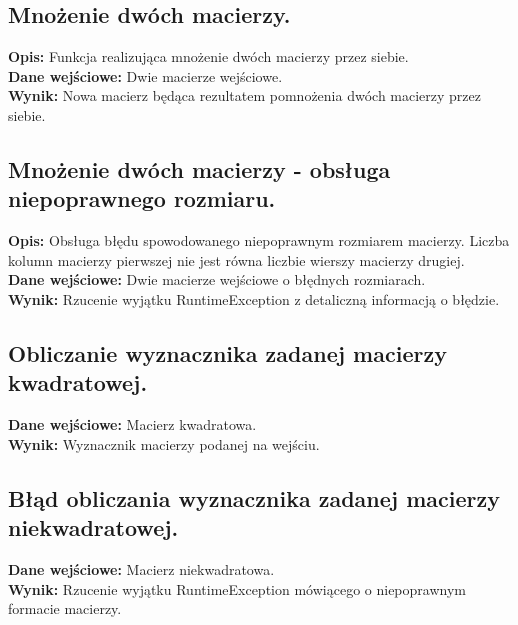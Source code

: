 \documentclass[a4paper,12pt,twoside]{article}
\begin{document}
\subsection{Mnożenie dwóch macierzy.}

\textbf{Opis:} Funkcja realizująca mnożenie dwóch macierzy przez siebie.\\
\textbf{Dane wejściowe:} Dwie macierze wejściowe.\\
\textbf{Wynik:} Nowa macierz będąca rezultatem pomnożenia dwóch macierzy przez siebie.

\subsection{Mnożenie dwóch macierzy - obsługa niepoprawnego rozmiaru.}

\textbf{Opis:} Obsługa błędu spowodowanego niepoprawnym rozmiarem macierzy. Liczba kolumn
macierzy pierwszej nie jest równa liczbie wierszy macierzy drugiej.\\
\textbf{Dane wejściowe:} Dwie macierze wejściowe o błędnych rozmiarach.\\
\textbf{Wynik:} Rzucenie wyjątku RuntimeException z detaliczną informacją o błędzie.

\subsection{Obliczanie wyznacznika zadanej macierzy kwadratowej.}

\textbf{Dane wejściowe:} Macierz kwadratowa.\\
\textbf{Wynik:} Wyznacznik macierzy podanej na wejściu.

\subsection{Błąd obliczania wyznacznika zadanej macierzy niekwadratowej.}

\textbf{Dane wejściowe:} Macierz niekwadratowa.\\
\textbf{Wynik:} Rzucenie wyjątku RuntimeException mówiącego o niepoprawnym formacie macierzy.

\end{document}
